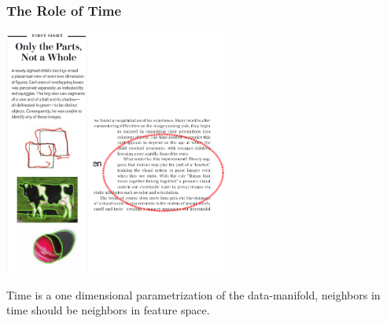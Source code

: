 \documentclass{beamer}
\begin{document}
\begin{frame}
\frametitle{The Role of Time} 
\centerline{\includegraphics[width=0.55\textwidth]{./images/TAE/vision.png}} 
Time is a one dimensional parametrization of the data-manifold, neighbors in time should be neighbors in feature space.
\end{frame} 
\end{document}
